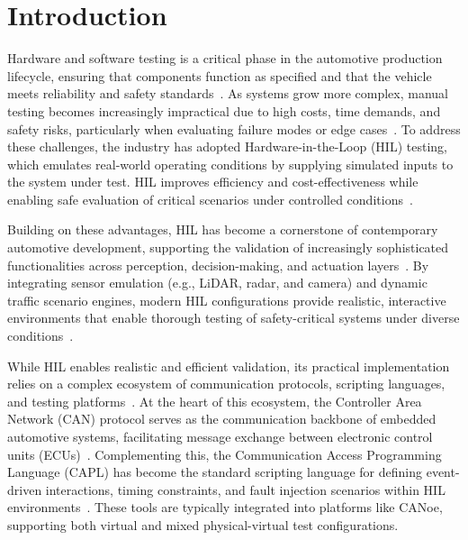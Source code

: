 \documentclass[a4paper,fleqn]{cas-dc}
\begin{document}
\section{Introduction}
Hardware and software testing is a critical phase in the automotive production lifecycle, ensuring that components function as specified and that the vehicle meets reliability and safety standards~\cite{garikapati2024dual}. As systems grow more complex, manual testing becomes increasingly impractical due to high costs, time demands, and safety risks, particularly when evaluating failure modes or edge cases~\cite{gaspar2024review}. To address these challenges, the industry has adopted Hardware-in-the-Loop (HIL) testing, which emulates real-world operating conditions by supplying simulated inputs to the system under test. HIL improves efficiency and cost-effectiveness while enabling safe evaluation of critical scenarios under controlled conditions~\cite{cheng2024survey}.

Building on these advantages, HIL has become a cornerstone of contemporary automotive development, supporting the validation of increasingly sophisticated functionalities across perception, decision-making, and actuation layers~\cite{howick2024framework}. By integrating sensor emulation (e.g., LiDAR, radar, and camera) and dynamic traffic scenario engines, modern HIL configurations provide realistic, interactive environments that enable thorough testing of safety-critical systems under diverse conditions~\cite{jooriah2024co}. 

While HIL enables realistic and efficient validation, its practical implementation relies on a complex ecosystem of communication protocols, scripting languages, and testing platforms~\cite{ali2024efficient}. At the heart of this ecosystem, the Controller Area Network (CAN) protocol serves as the communication backbone of embedded automotive systems, facilitating message exchange between electronic control units (ECUs)~\cite{inproceedings}. Complementing this, the Communication Access Programming Language (CAPL) has become the standard scripting language for defining event-driven interactions, timing constraints, and fault injection scenarios within HIL environments~\cite{annilsson_can}. These tools are typically integrated into platforms like CANoe, supporting both virtual and mixed physical-virtual test configurations.
\end{document}
